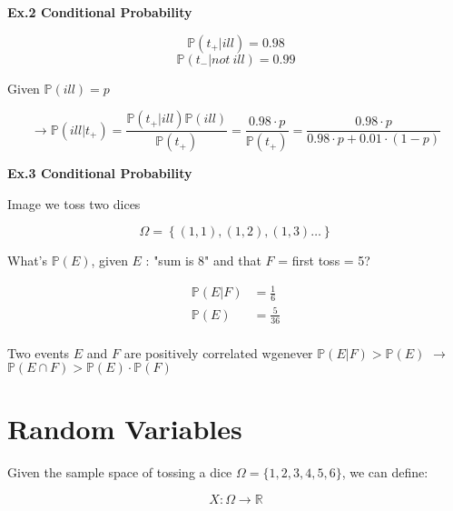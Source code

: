             \textbf{Ex.2 Conditional Probability}
            
            \[\mathbb{P} (t_+ | ill) = 0.98 \]
            \[\mathbb{P} (t_- | not \ ill) = 0.99 \]               
            
            Given \( \mathbb{P}(ill) = p  \)
            
            \begin{equation}
                \rightarrow \mathbb{P} (ill | t_+) = \frac{\mathbb{P} (t_+ | ill)\mathbb{P} (ill)}{\mathbb{P}(t_+)} = \frac{0.98 \cdot p}{\mathbb{P}(t_+)} = \frac{0.98 \cdot p}{0.98 \cdot p + 0.01 \cdot (1-p)} 
            \end{equation}
            
            \textbf{Ex.3 Conditional Probability}
            
            Image we toss two dices
            
            \[ \Omega = \left\{ (1,1),(1,2),(1,3) \ldots \right\} \]
            
            What's \( \mathbb{P} (E) \), given \(E\) : "sum is 8" and that \(F\) = first toss = 5?
            
            \begin{equation}
            \begin{split}
                \mathbb{P} (E|F) & = \frac{1}{6} \\
                \mathbb{P} (E) & = \frac{5}{36} \\
            \end{split}
            \end{equation}
            
            Two events $E$ and $F$ are positively correlated wgenever $\mathbb{P} (E|F) > \mathbb{P} (E)$ $\rightarrow$ $\mathbb{P} (E \cap F) > \mathbb{P} (E) \cdot \mathbb{P} (F)$
            
            

\section{Random Variables}

        Given the sample space of tossing a dice \(\Omega = \{1,2,3,4,5,6\} \), we can define:

            \[X: \Omega \rightarrow \mathbb{R} \]


